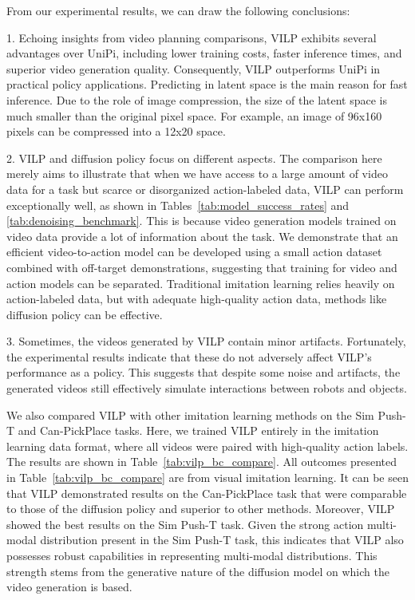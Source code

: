 \documentclass[doublecolumn]{IEEEtran}
\begin{document}
From our experimental results, we can draw the following conclusions:

1. Echoing insights from video planning comparisons, VILP exhibits several advantages over UniPi, including lower training costs, faster inference times, and superior video generation quality. Consequently, VILP outperforms UniPi in practical policy applications. {Predicting in latent space is the main reason for fast inference. Due to the role of image compression, the size of the latent space is much smaller than the original pixel space. For example, an image of 96x160 pixels can be compressed into a 12x20 space.}


2. VILP and diffusion policy focus on different aspects. The comparison here merely aims to illustrate that when we have access to a large amount of video data for a task but scarce or disorganized action-labeled data, VILP can perform exceptionally well, as shown in Tables~\ref{tab:model_success_rates} and \ref{tab:denoising_benchmark}. This is because video generation models trained on video data provide a lot of information about the task. 
We demonstrate that an efficient video-to-action model can be developed using a small action dataset combined with off-target demonstrations, suggesting that training for video and action models can be  separated. Traditional imitation learning relies heavily on action-labeled data, but with adequate high-quality action data, methods like diffusion policy can be effective.

3. {Sometimes, the videos generated by VILP contain minor artifacts. Fortunately, the experimental results indicate that these do not adversely affect VILP's performance as a policy. This suggests that despite some noise and artifacts, the generated videos still effectively simulate interactions between robots and objects.}


{We also compared VILP with other imitation learning methods on the Sim Push-T and Can-PickPlace tasks. Here, we trained VILP entirely in the imitation learning data format, where all videos were paired with high-quality action labels. The results are shown in Table~\ref{tab:vilp_bc_compare}. All outcomes presented in Table~\ref{tab:vilp_bc_compare} are from visual imitation learning. It can be seen that VILP demonstrated results on the Can-PickPlace task that were comparable to those of the diffusion policy and superior to other methods. Moreover, VILP showed the best results on the Sim Push-T task. Given the strong action multi-modal distribution present in the Sim Push-T task, this indicates that VILP also possesses robust capabilities in representing multi-modal distributions. This strength stems from the generative nature of the diffusion model on which the video generation is based.}
\end{document}
